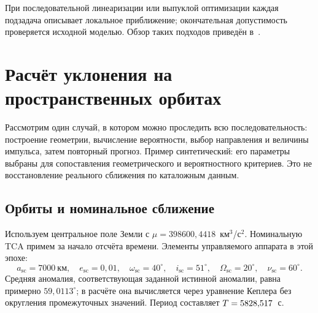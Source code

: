 \documentclass[a4paper,11pt]{article}
\numberwithin{equation}{section}
\begin{document}
При последовательной линеаризации или выпуклой оптимизации
каждая подзадача описывает локальное приближение;
окончательная допустимость проверяется исходной моделью.
Обзор таких подходов приведён в~\cite{review}.

\section{Расчёт уклонения на пространственных орбитах}
\label{sec:example}

Рассмотрим один случай, в котором можно проследить всю
последовательность: построение геометрии, вычисление вероятности,
выбор направления и величины импульса, затем повторный прогноз.
Пример синтетический: его параметры выбраны для сопоставления
геометрического и вероятностного критериев. Это не восстановление
реального сближения по каталожным данным.

\subsection{Орбиты и номинальное сближение}

Используем центральное поле Земли с
$\mu=398600{,}4418$~км$^3$/с$^2$. Номинальную TCA примем
за начало отсчёта времени. Элементы управляемого аппарата в этой
эпохе:
\begin{equation}
 a_{\mathrm{sc}}=7000~\text{км},\quad e_{\mathrm{sc}}=0{,}01,\quad
 \omega_{\mathrm{sc}}=40^\circ,\quad i_{\mathrm{sc}}=51^\circ,\quad
 \Omega_{\mathrm{sc}}=20^\circ,\quad\nu_{\mathrm{sc}}=60^\circ.
 \label{eq:example-primary}
\end{equation}
Средняя аномалия, соответствующая заданной истинной аномалии,
равна примерно $59{,}0113^\circ$; в расчёте она вычисляется
через уравнение Кеплера без округления промежуточных значений.
Период составляет $T=5828{,}517$~с.
\end{document}
